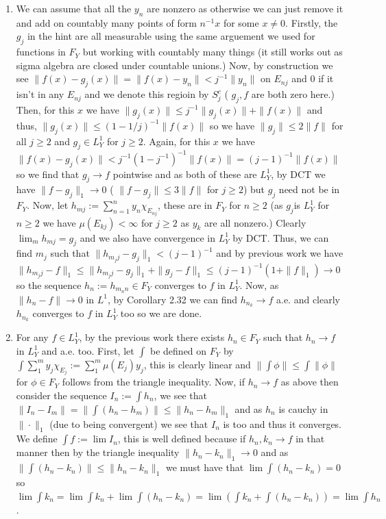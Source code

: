 \documentclass[12pt,a4paper]{article}
\begin{document}
\begin{solution}
\begin{enumerate}[label=\alph*.]
\item  We can assume that all the $y_n$ are nonzero as otherwise we can just remove it and add on countably many points of form $n^{-1}x$ for some $x\neq 0$. 
    Firstly, the $g_j$ in the hint are all measurable using the same arguement we used for functions in $F_Y$ but working with countably many things (it still works out as sigma algebra are closed under countable unions.) 
    Now, by construction we see $\|f(x)-g_j(x)\|=\|f(x)-y_n\|<j^{-1}\|y_n\|$ on $E_{nj}$ and $0$ if it isn't in any $E_{nj}$ and we denote this regioin by $S_j^c$ ( $g_j,f$ are both zero here.)  
    Then, for this $x$ we have $\|g_j(x)\|\leq j^{-1}\|g_j(x)\|+\|f(x)\|$ and thus, $\|g_j(x)\|\leq(1-1/j)^{-1}\|f(x)\|$ so we have $\|g_j\|\leq 2\|f\|$ for all $j\geq 2$ and $g_j\in L_Y^1$ for $j\geq 2.$ 
    Again, for this $x$ we have $\|f(x)-g_j(x)\|<j^{-1}(1-j^{-1})^{-1}\|f(x)\|=(j-1)^{-1}\|f(x)\|$ so we find that $g_j\to f$ pointwise and as both of these are $L_Y^1$, by DCT we have $\|f-g_j\|_1\to 0$ ( $\|f-g_j\|\leq 3\|f\|$ for $j\geq 2$) but $g_j$ need not be in $F_Y.$ 
    Now, let $h_{mj}:=\sum_{n=1}^{n}y_n\chi_{E_{nj}}$, these are in $F_Y$ for $n\geq 2$ (as $g_j$is $L_Y^1$ for $n\geq 2$ we have $\mu(E_{kj})<\infty$ for $j\geq 2$ as $y_k$ are all nonzero.) 
    Clearly $\lim_mh_{mj}=g_j$ and we also have convergence in $L^1_Y$ by DCT. 
    Thus, we can find $m_j$ such that $\|h_{m_jj}-g_j\|_1<(j-1)^{-1}$ and by previous work we have $\|h_{m_jj}-f\|_1\leq\|h_{m_jj}-g_j\|_1+\|g_j-f\|_1\leq(j-1)^{-1}(1+\|f\|_1)\to 0$ so the sequence $h_n:=h_{m_nn}\in F_Y$ converges to $f$ in $L_Y^1$. 
    Now, as $\|h_n-f\|\to 0$ in $L^1$, by Corollary 2.32 we can find $h_{n_k}\to f$ a.e. and clearly $h_{n_k}$ converges to $f$ in $L_Y^1$ too so we are done. 
\item For any $f\in L_Y^1$, by the previous work there exists $h_n\in F_Y$ such that $h_n\to f$ in $L_Y^1$ and a.e. too. 
    First, let $\int$ be defined on $F_Y$ by $\int\sum_1^my_j\chi_{E_j}:=\sum_1^m\mu(E_j)y_j$, this is clearly linear and $\|\int \phi\|\leq\int\|\phi\|$ for $\phi\in F_Y$ follows from the triangle inequality.  
    Now, if $h_n\to f$ as above then consider the sequence $I_n:=\int h_n$, we see that $\|I_n-I_m\|=\|\int(h_n-h_m)\|\leq\|h_n-h_m\|_1$ and as $h_n$ is cauchy in $\|\cdot\|_1$ (due to being convergent) we see that $I_n$ is too and thus it converges. 
    We define $\int f:=\lim I_n$, this is well defined because if $h_n,k_n\to f$ in that manner then by the triangle inequality $\|h_n-k_n\|_1\to 0$ and as $\|\int (h_n-k_n)\|\leq\|h_n-k_n\|_1$ we must have that $\lim\int(h_n-k_n)=0$ so $\lim\int k_n=\lim\int k_n+\lim\int(h_n-k_n)=\lim(\int k_n+\int(h_n-k_n))=\lim\int h_n$. 

\end{enumerate}
\end{solution}
\end{document}

